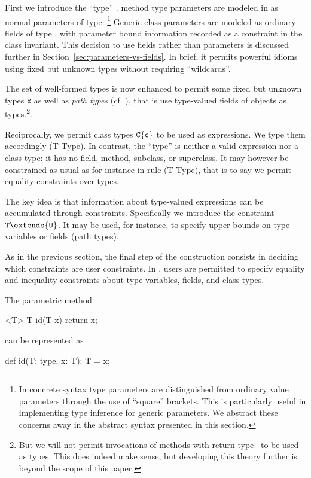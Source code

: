 First we introduce the ``type'' \type. \FGJ{} method type
parameters are modeled in \FXG{} as normal parameters of type
\type.\footnote{In concrete \Xten{} syntax type parameters are
distinguished from ordinary value parameters through the use of
``square'' brackets. This is particularly useful in implementing type
inference for generic parameters. We abstract these concerns away in
the abstract syntax presented in this section.}  Generic class
parameters are modeled as ordinary fields of type \type, with
parameter bound information recorded as a constraint in the class
invariant. This decision to use fields rather than parameters is
discussed further in Section~\ref{sec:parameters-vs-fields}. In brief,
it permits powerful idioms using fixed but unknown types without
requiring ``wildcards''.

The set of well-formed types is now enhanced to permit some fixed but unknown
types {\tt x} as well as \emph{path types} (cf. \cite{scala}), that is use type-valued fields of objects as types.\footnote{But we will not permit invocations of methods with return type \type\ to be 
used as types. This does indeed make sense, but developing
this theory further is beyond the scope of this paper.}.

Reciprocally, we permit class types ${\tt C}\{{\tt c}\}$ to be used as expressions. We type them accordingly ({\sc T-Type}). In contrast, the ``type'' \type{} is neither a valid expression nor a class type: it has no field, method, subclass, or superclass. It may however be constrained as usual as for instance in rule ({\sc T-Type}), that is to say we permit equality constraints over types.

The key idea is that information about type-valued expressions can
be accumulated through constraints. Specifically we introduce 
the constraint ${\tt T}\extends{\tt U}$. It may be used, for
instance, to specify upper bounds on type variables or fields (path
types).

As in the previous section, the final step of the construction consists in deciding which constraints are user constraints. In \FXG{}, users are permitted to specify equality and inequality constraints about type variables, fields, and class types.


\begin{example}
The \FGJ{} parametric method

\begin{xten} 
<T> T id(T x) { return x; }
\end{xten}
\noindent can be represented as
\begin{xten} 
def id(T: type, x: T): T = x;
\end{xten}
\end{example}

